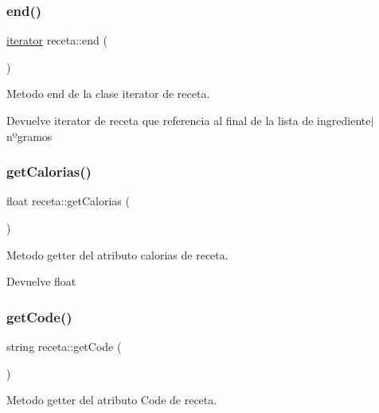\subsubsection{\texorpdfstring{end()}{end()}}
{\footnotesize\ttfamily \hyperlink{classreceta_1_1iterator}{iterator} receta\+::end (\begin{DoxyParamCaption}{ }\end{DoxyParamCaption})\hspace{0.3cm}{\ttfamily [inline]}}



Metodo end de la clase iterator de receta. 

\begin{DoxyReturn}{Devuelve}
iterator de receta que referencia al final de la lista de ingrediente$\vert$nºgramos 
\end{DoxyReturn}
\mbox{\label{classreceta_a668b197536226523765069118c1fa30d}} 
\subsubsection{\texorpdfstring{get\+Calorias()}{getCalorias()}}
{\footnotesize\ttfamily float receta\+::get\+Calorias (\begin{DoxyParamCaption}{ }\end{DoxyParamCaption})}



Metodo getter del atributo calorias de receta. 

\begin{DoxyReturn}{Devuelve}
float 
\end{DoxyReturn}
\mbox{\label{classreceta_a7d9969d8201bf98b3d4716e010aa00a7}} 
\subsubsection{\texorpdfstring{get\+Code()}{getCode()}}
{\footnotesize\ttfamily string receta\+::get\+Code (\begin{DoxyParamCaption}{ }\end{DoxyParamCaption})}



Metodo getter del atributo Code de receta. 

